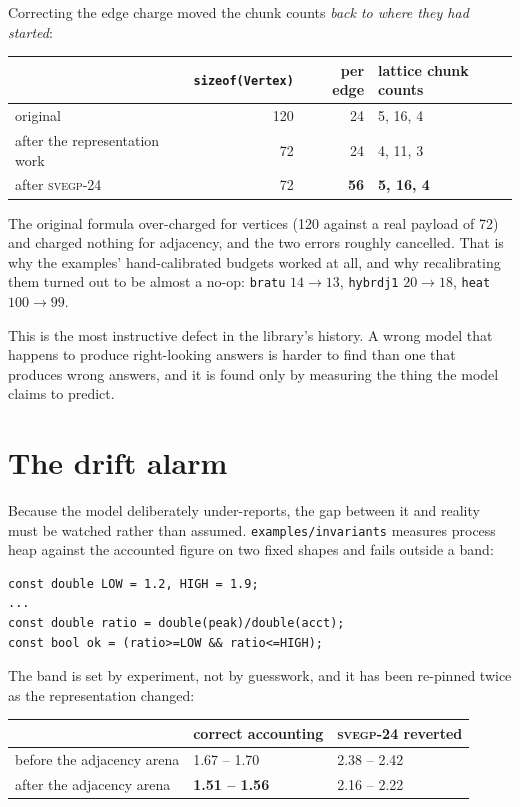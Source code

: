 \documentclass[11pt,a4paper]{report}
\newcommand{\svegp}[1]{\textsc{svegp-#1}}
\newcommand{\code}[1]{\texttt{#1}}
\begin{document}
Correcting the edge charge moved the chunk counts \emph{back to where they had
started}:

\begin{center}
\begin{tabular}{@{}lrrl@{}}
\toprule
 & \code{sizeof(Vertex)} & per edge & lattice chunk counts \\
\midrule
original                  & 120 & 24 & 5, 16, 4 \\
after the representation work & 72 & 24 & 4, 11, 3 \\
after \svegp{24}          & 72 & \textbf{56} & \textbf{5, 16, 4} \\
\bottomrule
\end{tabular}
\end{center}

The original formula over-charged for vertices (120 against a real payload of
72) and charged nothing for adjacency, and the two errors roughly cancelled.
That is why the examples' hand-calibrated budgets worked at all, and why
recalibrating them turned out to be almost a no-op: \code{bratu} $14\to13$,
\code{hybrdj1} $20\to18$, \code{heat} $100\to99$.

This is the most instructive defect in the library's history. A wrong model
that happens to produce right-looking answers is harder to find than one that
produces wrong answers, and it is found only by measuring the thing the model
claims to predict.

\section{The drift alarm}

Because the model deliberately under-reports, the gap between it and reality
must be watched rather than assumed. \code{examples/invariants} measures process
heap against the accounted figure on two fixed shapes and fails outside a band:

\begin{lstlisting}
const double LOW = 1.2, HIGH = 1.9;
...
const double ratio = double(peak)/double(acct);
const bool ok = (ratio>=LOW && ratio<=HIGH);
\end{lstlisting}

The band is set by experiment, not by guesswork, and it has been re-pinned twice
as the representation changed:

\begin{center}
\begin{tabular}{@{}lll@{}}
\toprule
 & correct accounting & \svegp{24} reverted \\
\midrule
before the adjacency arena & 1.67 -- 1.70 & 2.38 -- 2.42 \\
after the adjacency arena  & \textbf{1.51 -- 1.56} & 2.16 -- 2.22 \\
\bottomrule
\end{tabular}
\end{center}
\end{document}
